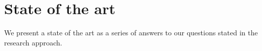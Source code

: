 \chapter{State of the art}
We present a state of the art as a series of answers to our questions stated in the research approach.






